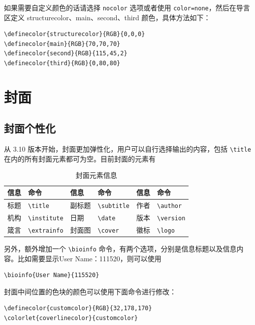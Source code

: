 \documentclass[lang=cn,newtx,10pt,scheme=chinese]{elegantbook}
\begin{document}
如果需要自定义颜色的话请选择 \lstinline{nocolor} 选项或者使用 \lstinline{color=none}，然后在导言区定义 structurecolor、main、second、third 颜色，具体方法如下：
\begin{lstlisting}[tabsize=4]
\definecolor{structurecolor}{RGB}{0,0,0}
\definecolor{main}{RGB}{70,70,70}    
\definecolor{second}{RGB}{115,45,2}    
\definecolor{third}{RGB}{0,80,80}
\end{lstlisting}

\section{封面}

\subsection{封面个性化}

从 3.10 版本开始，封面更加弹性化，用户可以自行选择输出的内容，包括 \lstinline{\title} 在内的所有封面元素都可为空。目前封面的元素有

\begin{table}[htbp]
  \centering
  \caption{封面元素信息}
  \begin{tabular}{p{}p{}|p{}p{}|p{}p{}}
    \hline
    信息 & 命令 & 信息 & 命令 & 信息 & 命令 \\
    \hline
    标题 & \lstinline|\title| & 副标题 & \lstinline|\subtitle| & 作者 & \lstinline|\author| \\
    机构 & \lstinline|\institute| & 日期 &  \lstinline|\date| & 版本 & \lstinline|\version| \\
    箴言 & \lstinline|\extrainfo| & 封面图 & \lstinline|\cover| & 徽标 & \lstinline|\logo| \\
    \hline
  \end{tabular}
\end{table}

另外，额外增加一个 \lstinline{\bioinfo} 命令，有两个选项，分别是信息标题以及信息内容。比如需要显示{\kaishu User Name：111520}，则可以使用 
\begin{lstlisting}
\bioinfo{User Name}{115520}
\end{lstlisting}

封面中间位置的色块的颜色可以使用下面命令进行修改：
\begin{lstlisting}
\definecolor{customcolor}{RGB}{32,178,170}
\colorlet{coverlinecolor}{customcolor}
\end{lstlisting}
\end{document}
